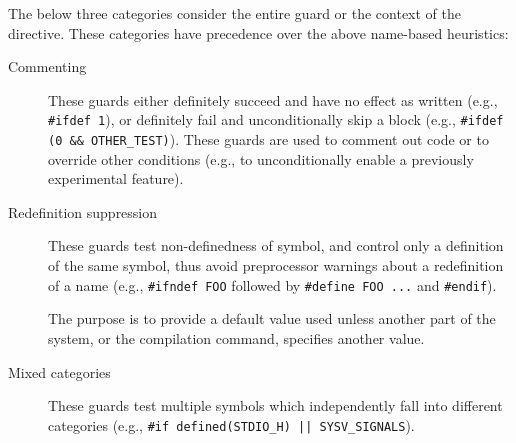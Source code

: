 The below three categories consider the entire guard or the context of
the directive.  These categories have precedence over the above name-based
heuristics:

\begin{description}
\item[Commenting] These guards either definitely succeed and
  have no effect as written (e.g., \texttt{\#ifdef 1}), or definitely fail
  and unconditionally skip a block (e.g., {\tt \#ifdef (0 \&\&
    \verb|OTHER_TEST|)}).  These guards are used to comment out code or to
  override other conditions (e.g., to unconditionally enable a previously
  experimental feature).
      
\item[Redefinition suppression] These guards test non-definedness of
  symbol, and control only  a definition of the same symbol, thus avoid preprocessor
      warnings about a redefinition of a name (e.g., \texttt{\#ifndef
      FOO} followed by \texttt{\#define FOO ...} and \texttt{\#endif}).
    
    The purpose is to provide a default value used unless another part of
    the system, or the compilation command, specifies another value.

\item[Mixed categories] These guards test multiple symbols
      which independently fall into different categories (e.g.,
      {\tt \#if defined(\verb|STDIO_H|) || \verb|SYSV_SIGNALS|}).

\end{description}


